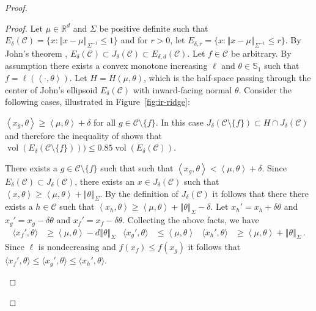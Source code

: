 \documentclass[letter, 12pt]{report}
\newcommand{\R}{\mathbb R}
\newcommand{\ip}[1]{\left \langle #1 \right \rangle}
\newcommand{\sip}[1]{\langle #1 \rangle}
\newcommand{\sphere}{\mathbb{S}}
\newcommand{\norm}[1]{\left \Vert  #1 \right \Vert}
\newcommand{\cC}{\mathcal C}
\newcommand{\vol}{\operatorname{vol}}
\newcommand{\1}{\mathbf{1}}
\theoremstyle{plain}
\theoremstyle{definition}
\theoremstyle{remark}
\begin{document}
\begin{proof}
    \begin{proof}
        Let $\mu \in \R^d$ and $\Sigma$ be positive definite such that $E_{\delta}(\cC) = \{x : \norm{x - \mu}_{\Sigma^{-1}} \leq 1 \}$ and for $r > 0$,
        let $E_{\delta,r} = \{x : \norm{x - \mu}_{\Sigma^{-1}} \leq r\}$.
        By John's theorem \citep[Remark 2.1.17]{ASG15}, $E_{\delta}(\cC) \subset J_\delta(\cC) \subset E_{\delta,d}(\cC)$.
        Let $f \in \cC$ be arbitrary.
        By assumption there exists a convex monotone increasing $\ell$ and $\theta \in \sphere_1$ such that
        $f = \ell(\ip{\cdot, \theta})$.
        Let $H = H(\mu, \theta)$, which is the half-space passing through the center of John's ellipsoid $E_{\delta}(\cC)$ with inward-facing normal $\theta$.
        Consider the following cases, illustrated in Figure~\ref{fig:ir-ridge}:
        \begin{enumcases}
            \item \label{lem:ir-ridge:c1} $\ip{x_g, \theta} \geq \ip{\mu, \theta} + \delta$ for all $g \in \cC \setminus \{f\}$.
            In this case $J_\delta(\cC \setminus \{f\}) \subset H \cap J_\delta(\cC)$ and therefore
            the inequality of \cite{khachiyan1990inequality} shows that
            $\vol(E_{\delta}(\cC \setminus \{f\}))) \leq 0.85 \vol(E_{\delta}(\cC))$.
            \item \label{lem:ir-ridge:c2} There exists a $g \in \cC \setminus \{f\}$ such that
            such that $\ip{x_g, \theta} < \ip{\mu, \theta} + \delta$.
            Since $E_{\delta}(\cC) \subset J_\delta(\cC)$, there exists an $x \in J_\delta(\cC)$ such that
            $\ip{x, \theta} \geq \ip{\mu, \theta} + \norm{\theta}_\Sigma$.
            By the definition of $J_\delta(\cC)$ it follows that there there exists a $h \in \cC$ such that
            $\ip{x_h, \theta} \geq \ip{\mu, \theta} + \norm{\theta}_\Sigma - \delta$.
            Let $x_h' = x_h + \delta \theta$ and $x_g' = x_g - \delta \theta$ and $x_f' = x_f - \delta \theta$.
            Collecting the above facts, we have
            \begin{align}
                \sip{x_f', \theta} & \geq \ip{\mu, \theta} - d \norm{\theta}_\Sigma                           &
                \sip{x_g', \theta} & \leq \ip{\mu, \theta}                                                    &
                \sip{x_h', \theta} & \geq \ip{\mu, \theta} + \norm{\theta}_\Sigma \,. \label{eq:ts-ridge:rel}
            \end{align}
            Since $\ell$ is nondecreasing and $f(x_f) \leq f(x_g)$ it follows that $\sip{x_f', \theta} \leq \sip{x_g', \theta} \leq \sip{x_h', \theta}$.

\end{enumcases}
\end{proof}
\end{proof}
\end{document}
